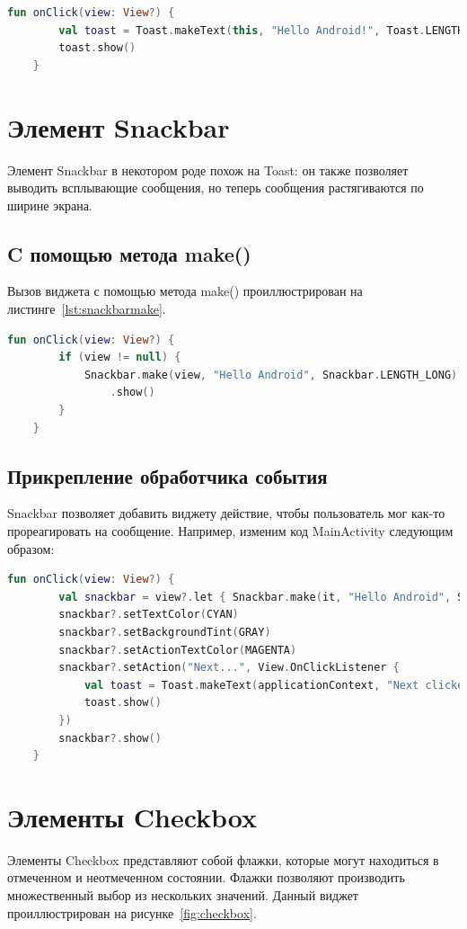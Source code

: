 \begin{lstlisting}[language=Kotlin, caption=\leftline{toast}, label=lst:toast]
fun onClick(view: View?) {
        val toast = Toast.makeText(this, "Hello Android!", Toast.LENGTH_LONG)
        toast.show()
    }
\end{lstlisting}

\section{Элемент Snackbar}
Элемент Snackbar в некотором роде похож на Toast: он также позволяет 
выводить всплывающие сообщения, но теперь сообщения растягиваются по 
ширине экрана.

\subsection{C помощью метода make()}
Вызов виджета с помощью метода make() проиллюстрирован на листинге~\ref{lst:snackbarmake}.
\begin{lstlisting}[language=Kotlin, caption=\leftline{snackbar}, label=lst:snackbarmake]
fun onClick(view: View?) {
        if (view != null) {
            Snackbar.make(view, "Hello Android", Snackbar.LENGTH_LONG)
                .show()
        }
    }
\end{lstlisting}
\subsection{Прикрепление обработчика события}
Snackbar позволяет добавить виджету действие, чтобы пользователь мог как-то прореагировать на сообщение.
Например, изменим код MainActivity следующим образом:
\begin{lstlisting}[language=Kotlin, caption=\leftline{setAction}, label=lst:setAction]
fun onClick(view: View?) {
        val snackbar = view?.let { Snackbar.make(it, "Hello Android", Snackbar.LENGTH_LONG) }
        snackbar?.setTextColor(CYAN)
        snackbar?.setBackgroundTint(GRAY)
        snackbar?.setActionTextColor(MAGENTA)
        snackbar?.setAction("Next...", View.OnClickListener {
            val toast = Toast.makeText(applicationContext, "Next clicked!", Toast.LENGTH_LONG)
            toast.show()
        })
        snackbar?.show()
    }
\end{lstlisting}
\section{Элементы Checkbox}
Элементы Checkbox представляют собой флажки, которые могут 
находиться в отмеченном и неотмеченном состоянии. Флажки позволяют 
производить множественный выбор из нескольких значений.
Данный виджет проиллюстрирован на рисунке~\ref{fig:checkbox}.

